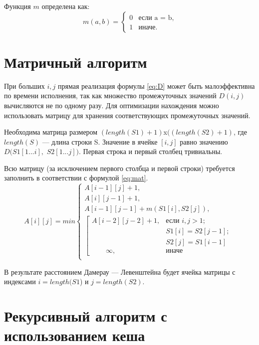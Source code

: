 Функция $m$ определена как:
\begin{equation}
	\label{eq:1.2}
	m(a, b) = \begin{cases}
		0 &\text{если a = b,}\\
		1 &\text{иначе.}
	\end{cases}
\end{equation}

\section{Матричный алгоритм}

При больших $i, j$ прямая реализация формулы \ref{eq:D} может быть малоэффективна по времени исполнения, так как множество промежуточных значений $ D(i, j)$ вычисляются не по одному разу. Для оптимизации нахождения можно использовать матрицу для хранения соответствующих промежуточных значений.

Необходима матрица размером $(length(S1)+ 1)$x$((length(S2) + 1)$, где $length(S)$ — длина строки S. Значение в ячейке $[i, j]$ равно значению $D(S1[1...i],$ $S2[1...j])$. Первая строка и первый столбец тривиальны. 

Всю матрицу (за исключением первого столбца и первой строки) требуется заполнить в соответствии с формулой \ref{eq:mat}.
\begin{equation}
	\label{eq:mat}
	A[i][j] = min \begin{cases}
		A[i-1][j] + 1,\\
		 A[i][j-1] + 1,\\
		 A[i-1][j-1] + m(S1[i], S2[j]),\\
		 \left[ \begin{array}{cc}A[i-2][j-2] + 1, &\text{если }i,j > 1;\\
		 	\qquad &\text{}S1[i] = S2[j-1]; \\
		 	\qquad &\text{}S2[j] = S1[i-1]\\
		 	\qquad \infty, & \text{иначе}\end{array}\right.\\
		 
	 \end{cases}
 \end{equation}
 
В результате расстоянием Дамерау — Левенштейна будет ячейка матрицы с индексами $i = length(S1$) и $j = length(S2)$.

\section{Рекурсивный алгоритм с использованием кеша}
\label{sec:recmat}

